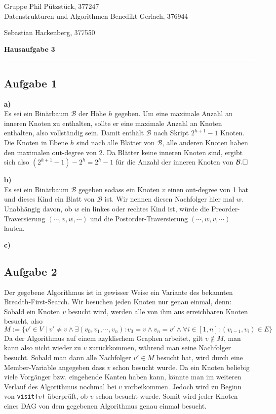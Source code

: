 \documentclass[a4paper,graphics,11pt]{article}
\newcommand{\aufgabe}[1]{\subsection*{Aufgabe #1}}
\begin{document}
\noindent Gruppe              \hfill Phil Pützstück, 377247\\
\noindent Datenstrukturen und Algorithmen \hfill Benedikt Gerlach, 376944\\
\strut\hfill Sebastian Hackenberg, 377550\\
\begin{center}
	\LARGE{\textbf{Hausaufgabe 3}}
\end{center}
\begin{center}
\rule[0.1ex]{\textwidth}{1pt}
\end{center}

\aufgabe{1}
\textbf{a)} \\
Es sei ein Binärbaum $\mathcal{B}$ der Höhe $h$ gegeben. Um eine maximale Anzahl an inneren Knoten zu enthalten, sollte er eine 
maximale Anzahl an Knoten enthalten, also vollständig sein.
Damit enthält $\mathcal{B}$ nach Skript $2^{h+1} - 1$ Knoten.
Die Knoten in Ebene $h$ sind nach alle Blätter von $\mathcal{B}$, alle anderen Knoten haben den maximalen out-degree
von 2. Da Blätter keine inneren Knoten sind, ergibt sich also $(2^{h+1} - 1) - 2^h = 2^h - 1$ für die Anzahl
der inneren Knoten von $\mathcal{B}.\hfill\square$

\textbf{b)}\\
Es sei ein Binärbaum $\mathcal{B}$ gegeben sodass ein Knoten $v$ einen out-degree von 1 hat und dieses Kind
ein Blatt von $\mathcal{B}$ ist.
Wir nennen diesen Nachfolger hier mal $w$. Unabhängig davon, ob $w$ ein linkes oder rechtes Kind ist,
würde die Preorder-Traversierung $(\cdots, v, w, \cdots)$ und die Postorder-Traversierung $(\cdots, w, v, \cdots)$
lauten. 


\textbf{c)}



\aufgabe{2}
Der gegebene Algorithmus ist in gewisser Weise ein Variante des bekannten Breadth-First-Search.
Wir besuchen jeden Knoten nur genau einmal, denn:\\
Sobald ein Knoten $v$ besucht wird, werden alle von ihm aus erreichbaren Knoten besucht, also
$$
M := \{v' \in V \mid v' \neq v \land \exists (v_0, v_1, \cdots, v_n) : v_0 = v \land v_n = v' \land \forall i \in [1,n] : (v_{i-1}, v_i) \in E\}
$$
Da der Algorithmus auf einem azyklischem Graphen arbeitet, gilt $v \notin M$, man kann also nicht wieder zu $v$
zurückkommen, während man seine Nachfolger besucht. Sobald man dann alle Nachfolger $v' \in M$ besucht hat,
wird durch eine Member-Variable angegeben dass $v$ schon besucht wurde. Da ein Knoten beliebig viele Vorgänger
bzw. eingehende Kanten haben kann, könnte man im weiteren Verlauf des Algorithmus nochmal bei $v$ vorbeikommen.
Jedoch wird zu Beginn von \texttt{visit($v$)} überprüft, ob $v$ schon besucht wurde. Somit wird jeder Knoten eines DAG
von dem gegebenen Algorithmus genau einmal besucht.
\end{document}
